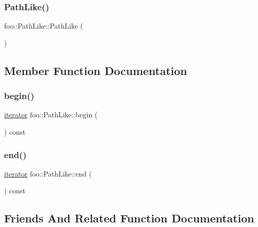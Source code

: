 \subsubsection{\texorpdfstring{PathLike()}{PathLike()}}
{\footnotesize\ttfamily foo\+::\+Path\+Like\+::\+Path\+Like (\begin{DoxyParamCaption}{ }\end{DoxyParamCaption})\hspace{0.3cm}{\ttfamily [inline]}}



\subsection{Member Function Documentation}
\mbox{\label{classfoo_1_1PathLike_a7ca8b63139fd6fcada55fbf13ccf9c83}} 
\subsubsection{\texorpdfstring{begin()}{begin()}}
{\footnotesize\ttfamily \mbox{\hyperlink{structfoo_1_1PathLike_1_1iterator}{iterator}} foo\+::\+Path\+Like\+::begin (\begin{DoxyParamCaption}{ }\end{DoxyParamCaption}) const\hspace{0.3cm}{\ttfamily [inline]}}

\mbox{\label{classfoo_1_1PathLike_aca85cd005890f1d19f416ca7e2c95f02}} 
\subsubsection{\texorpdfstring{end()}{end()}}
{\footnotesize\ttfamily \mbox{\hyperlink{structfoo_1_1PathLike_1_1iterator}{iterator}} foo\+::\+Path\+Like\+::end (\begin{DoxyParamCaption}{ }\end{DoxyParamCaption}) const\hspace{0.3cm}{\ttfamily [inline]}}



\subsection{Friends And Related Function Documentation}
\mbox{\label{classfoo_1_1PathLike_ab5544a5497a8a470802bd8fcf97c49da}} 
